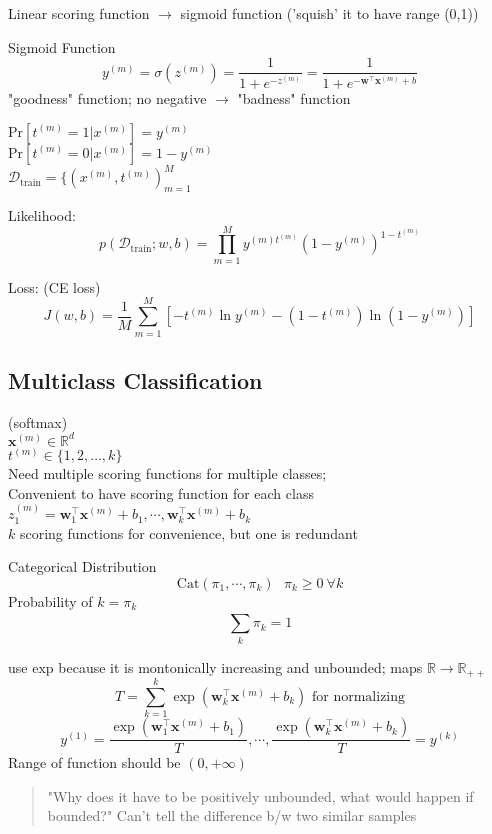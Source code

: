 \documentclass{article}
\begin{document}
\begin{list}{}{}
        
    \item Linear scoring function $\to$ sigmoid function ('squish' it to have range (0,1))
        \begin{definition}
            {Sigmoid Function}{}
            \[ 
                y^{(m)} = \sigma (z^{(m)}) = \frac{1}{1+e^{-z^{(m)}}} = \frac{1}{1+e^{
                    -\mathbf w^\top \mathbf x ^{(m)} +b
                }}
            \]
            "goodness" function; no negative $\to$ "badness" function
        \end{definition}
        $\mathrm{Pr} [t^{(m)} = 1 | x^{(m)}] = y^{(m)}$
        \\
        $\mathrm{Pr} [t^{(m)} = 0 | x^{(m)}] = 1 - y^{(m)}$\\
        $\mathcal D_{\mathrm{train}} = \{ (x^{(m)} , t^{(m)})_{m=1}^M$
    \item Likelihood:
        \[
            p(\mathcal D_{\mathrm{train}}; w,b) = \prod_{m=1}^{M} y^{(m)t^{(m)}}
            (1-y^{(m)})^{1-t^{(m)}}
        \]
    \item Loss: (CE loss)
        \[
            J(w,b) = \frac{1}{M} \sum_{m=1}^{M} \left [
                -t^{(m)}\ln y^{(m)} - (1-t^{(m)})\ln (1-y^{(m)})
            \right ]
        \]
\end{list}
\noindent

\subsection{Multiclass Classification}
(softmax)\\
$\mathbf x^{(m)} \in \mathbb R^d$\\
$t^{(m)} \in \{ 1, 2, \ldots, k \}$
\\
Need multiple scoring functions for multiple classes; \\
Convenient to have scoring function for each class\\
$z_1^{(m)} = \mathbf w_1^\top \mathbf x^{(m)} + b_1, \cdots, \mathbf w_k^\top \mathbf x^{(m)} + b_k$
\\
$k$ scoring functions for convenience, but one is redundant
\begin{definition}
    {Categorical Distribution}{}
    \[
        \mathrm{Cat}(\pi_1, \cdots, \pi_k) \ \ \ \pi_k \ge 0 \ \forall k
    \]
    Probability of $k = \pi_k$
    \[ \sum_{k}^{} \pi_k = 1 \]
\end{definition}
\noindent
use $\mathrm{exp}$ because it is montonically increasing and unbounded; maps $\mathbb R \to \mathbb R_{++}$
\[
    T = \sum_{k=1}^{k} \exp (\mathbf w_k^\top \mathbf x^{(m)} + b_k) \text{ for normalizing}
\]
\[
    y^{(1)} = \frac{\exp (\mathbf w_1^\top \mathbf x^{(m)} + b_1)}{T}, \cdots, \frac{\exp (\mathbf w_k^\top \mathbf x^{(m)} + b_k)}{T} = y^{(k)}
\]
\noindent
Range of function should be $(0, +\infty)$
\begin{quote}
    "Why does it have to be positively unbounded, what would happen if bounded?" 
    Can't tell the difference b/w two similar samples
\end{quote}
\end{document}
